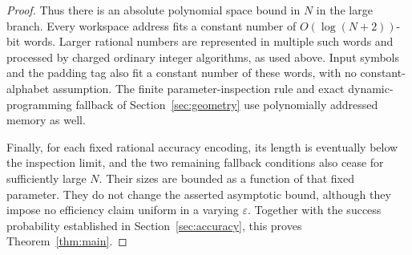 \begin{proof}
Thus there is an absolute polynomial space bound in $N$ in the
large branch.  Every workspace address fits a constant number of
$O(\log(N+2))$-bit words.  Larger rational numbers are represented
in multiple such words and processed by charged ordinary integer
algorithms, as used above.  Input symbols and the padding tag also
fit a constant number of these words, with no constant-alphabet
assumption.  The finite parameter-inspection rule and exact
dynamic-programming fallback of Section~\ref{sec:geometry} use
polynomially addressed memory as well.

Finally, for each fixed rational accuracy encoding, its length is
eventually below the inspection limit, and the two remaining
fallback conditions also cease for sufficiently large $N$.
Their sizes are bounded as a function of that fixed parameter.
They do not change the asserted asymptotic bound, although they
impose no efficiency claim uniform in a varying $\varepsilon$.
Together with the success probability established in
Section~\ref{sec:accuracy}, this proves Theorem~\ref{thm:main}.
\end{proof}
